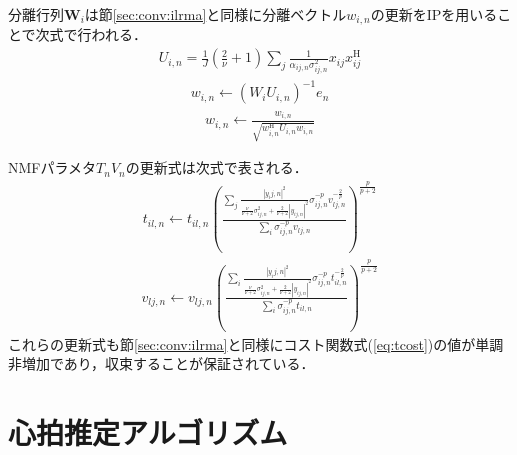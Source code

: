 分離行列$\bm{W}_{i}$は節\ref{sec:conv:ilrma}と同様に分離ベクトル$w_{i,n}$の更新をIPを用いることで次式で行われる．
\begin{align}
    U_{i,n}=\frac{1}{J}\left(\frac{2}{\nu}+1\right)\sum_{j}\frac{1}{\alpha_{ij,n}\sigma_{ij,n}^{2}}x_{ij}x_{ij}^{\mathrm{H}} \label{eq:tip1}
\end{align}
\begin{align}
    w_{i,n}\leftarrow\left(W_{i}U_{i,n}\right)^{-1}e_{n} \label{eq:tip2}
\end{align}
\begin{align}
    w_{i,n}\leftarrow\frac{w_{i,n}}{\sqrt{w_{i,n}^{\mathrm{H}}U_{i,n}w_{i,n}}} \label{eq:tip3}
\end{align}

NMFパラメタ$T_{n}V_{n}$の更新式は次式で表される．
\begin{align}
    t_{il,n}\leftarrow t_{il,n}\left(\frac{\sum_{j}\frac{|y_ij,n|^{2}}{\frac{\nu}{\nu+2}\sigma_{ij,n}^{2}+\frac{2}{\nu+2}|y_{ij,n}|^{2}}\sigma_{ij,n}^{-p}v_{lj,n}^{-\frac{2}{p}}}{\sum_{i}\sigma_{ij,n}^{-p}v_{lj,n}}\right)^{\frac{p}{p+2}} \label{eq:tt}
\end{align}
\begin{align}
    v_{lj,n}\leftarrow v_{lj,n}\left(\frac{\sum_{i}\frac{|y_ij,n|^{2}}{\frac{\nu}{\nu+2}\sigma_{ij,n}^{2}+\frac{2}{\nu+2}|y_{ij,n}|^{2}}\sigma_{ij,n}^{-p}t_{il,n}^{-\frac{2}{p}}}{\sum_{i}\sigma_{ij,n}^{-p}t_{il,n}}\right)^{\frac{p}{p+2}} \label{eq:tv}
\end{align}
これらの更新式も節\ref{sec:conv:ilrma}と同様にコスト関数式(\ref{eq:tcost})の値が単調非増加であり，収束することが保証されている．


\section{心拍推定アルゴリズム}
\label{sec:conv:heartrateestalgo}


